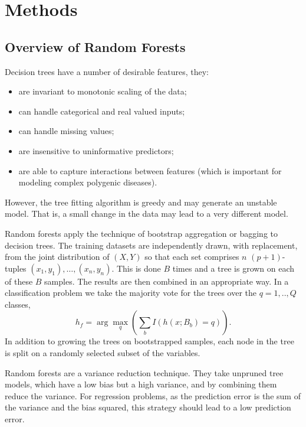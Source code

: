 \documentclass[10pt,letterpaper]{article}
\begin{document}
\section{Methods}
\label{section:methods}

\subsection{Overview of Random Forests}

Decision trees have a number of desirable features, they:
\begin{itemize}
  \item are invariant to monotonic scaling of the data;
  \item can handle categorical and real valued inputs;
  \item can handle missing values;
  \item are insensitive to uninformative predictors;
  \item are able to capture interactions between features (which is important for modeling complex polygenic diseases).
  \end{itemize}
However, the tree fitting algorithm is greedy and may generate an unstable model. That is, a small change in the data may
lead to a very different model. 

Random forests apply the technique of bootstrap aggregation or bagging to decision trees.  The training datasets are
independently drawn, with replacement, from the joint distribution of $(X,Y)$ so that each set comprises $n$
$(p+1)$-tuples $(x_1,y_1),\ldots, (x_n,y_n)$. This is done $B$ times and a tree is grown on each of these $B$ samples.
The results are then combined in an appropriate way. In a classification problem we take the majority vote for the trees
over the $q=1,..,Q$ classes,
\begin{equation*}
{{h_f}}= \arg \max_q \left(\sum_b I(h(x;B_b)=q)\right).
\end{equation*}
In addition to growing the trees
on bootstrapped samples, each node in the tree is split on a randomly
selected subset of the variables.

Random forests are a variance reduction technique. They take unpruned tree models, which have a low bias but a high
variance, and by combining them reduce the variance.  For regression problems, as the prediction error is the sum of the
variance and the bias squared, this strategy should lead to a low prediction error.
\end{document}
